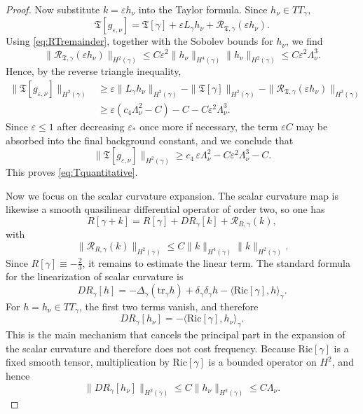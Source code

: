 \documentclass{amsart}
\newcommand{\tr}{\mbox{tr}}
\begin{document}
\begin{proof}
\noindent Now substitute $k=\varepsilon h_\nu$ into the Taylor formula. Since $h_\nu\in TT_\gamma$,
\[
\mathfrak T[g_{\varepsilon,\nu}]
=
\mathfrak T[\gamma]
+
\varepsilon L_\gamma h_\nu
+
\mathcal R_{\mathfrak T,\gamma}(\varepsilon h_\nu).
\]
Using \eqref{eq:RTremainder}, together with the Sobolev bounds for $h_\nu$, we find
\[
\|\mathcal R_{\mathfrak T,\gamma}(\varepsilon h_\nu)\|_{H^2(\gamma)}
\le
C\varepsilon^2
\|h_\nu\|_{H^4(\gamma)}
\|h_\nu\|_{H^2(\gamma)}
\le
C\varepsilon^2\Lambda_\nu^3.
\]
Hence, by the reverse triangle inequality,
\begin{align*}
\|\mathfrak T[g_{\varepsilon,\nu}]\|_{H^2(\gamma)}
&\ge
\varepsilon\|L_\gamma h_\nu\|_{H^2(\gamma)}
-
\|\mathfrak T[\gamma]\|_{H^2(\gamma)}
-
\|\mathcal R_{\mathfrak T,\gamma}(\varepsilon h_\nu)\|_{H^2(\gamma)}\\
&\ge
\varepsilon(c_4\Lambda_\nu^2-C)
-
C
-
C\varepsilon^2\Lambda_\nu^3.
\end{align*}
Since $\varepsilon\le1$ after decreasing $\varepsilon_*$ once more if necessary, the term $\varepsilon C$ may be absorbed into the final background constant, and we conclude that
\[
\|\mathfrak T[g_{\varepsilon,\nu}]\|_{H^2(\gamma)}
\ge
c_4\,\varepsilon\Lambda_\nu^2
-
C\varepsilon^2\Lambda_\nu^3
-
C.
\]
This proves \eqref{eq:Tquantitative}.

\smallskip
\noindent
Now we focus on the scalar curvature expansion.
The scalar curvature map is likewise a smooth quasilinear differential operator of order two, so one has
\[
R[\gamma+k]
=
R[\gamma]
+
DR_\gamma[k]
+
\mathcal R_{R,\gamma}(k),
\]
with
\begin{equation}
\label{eq:Rremainder}
\|\mathcal R_{R,\gamma}(k)\|_{H^2(\gamma)}
\le
C\|k\|_{H^4(\gamma)}\|k\|_{H^2(\gamma)}.
\end{equation}
Since $R[\gamma]\equiv-\frac23$, it remains to estimate the linear term. The standard formula for the linearization of scalar curvature is
\[
DR_\gamma[h]
=
-\Delta_\gamma(\tr_\gamma h)+\delta_\gamma\delta_\gamma h-\langle \text{Ric}[\gamma],h\rangle_\gamma.
\]
For $h=h_\nu\in TT_\gamma$, the first two terms vanish, and therefore
\[
DR_\gamma[h_\nu]
=
-\langle \text{Ric}[\gamma],h_\nu\rangle_\gamma.
\]
This is the main mechanism that cancels the principal part in the expansion of the scalar curvature and therefore does not cost frequency.
Because $\text{Ric}[\gamma]$ is a fixed smooth tensor, multiplication by $\text{Ric}[\gamma]$ is a bounded operator on $H^2$, and hence
\[
\|DR_\gamma[h_\nu]\|_{H^2(\gamma)}
\le
C\|h_\nu\|_{H^2(\gamma)}
\le
C\Lambda_\nu.
\]


\end{proof}
\end{document}
